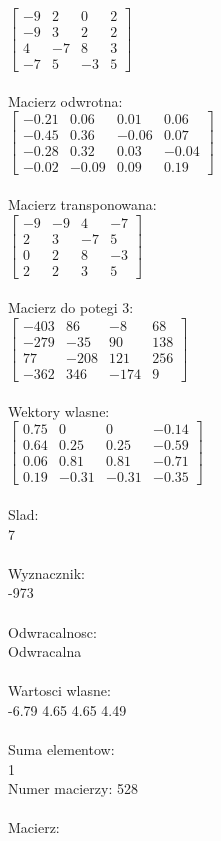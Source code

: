 \documentclass[a4paper,12pt]{article}
\begin{document}
$\begin{bmatrix} -9&2&0&2\\-9&3&2&2\\4&-7&8&3\\-7&5&-3&5 \end{bmatrix}$
\\
\\
Macierz odwrotna:\\

$\begin{bmatrix} -0.21&0.06&0.01&0.06\\-0.45&0.36&-0.06&0.07\\-0.28&0.32&0.03&-0.04\\-0.02&-0.09&0.09&0.19 \end{bmatrix}$
\\
\\
Macierz transponowana:\\

$\begin{bmatrix} -9&-9&4&-7\\2&3&-7&5\\0&2&8&-3\\2&2&3&5 \end{bmatrix}$
\\
\\
Macierz do potegi 3:\\

$\begin{bmatrix} -403&86&-8&68\\-279&-35&90&138\\77&-208&121&256\\-362&346&-174&9 \end{bmatrix}$
\\
\\
Wektory wlasne:\\

$\begin{bmatrix} 0.75&0&0&-0.14\\0.64&0.25&0.25&-0.59\\0.06&0.81&0.81&-0.71\\0.19&-0.31&-0.31&-0.35 \end{bmatrix}$
\\
\\
Slad:\\
7
\\
\\
Wyznacznik:\\
-973
\\
\\
Odwracalnosc:\\
Odwracalna
\\
\\
Wartosci wlasne:\\
-6.79 4.65 4.65 4.49
\\
\\
Suma elementow:\\
1
\\
\newpage
Numer macierzy:
528
\\
\\
Macierz:\\
\end{document}
